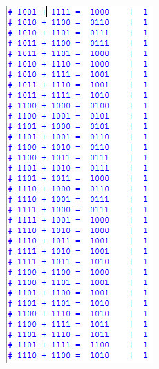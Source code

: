 \begin{figure}[H]
\begin{subfigure}[b]{0.44\textwidth}
			\label{fig:etapa3-7}
		\end{subfigure}
		~
		\begin{subfigure}[b]{0.44\textwidth}
			\includegraphics[width=\textwidth]{img/etapa3/simulacaoSomadorCompleto4Bits_8}
			\label{fig:etapa3-8}
		\end{subfigure}


\end{figure}
